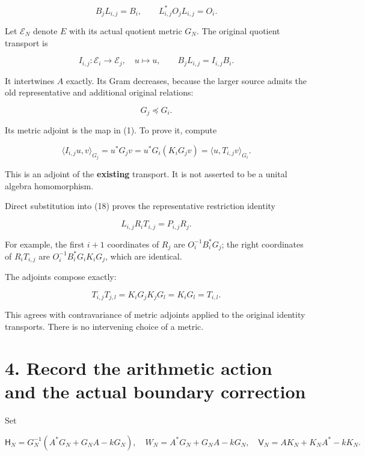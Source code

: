 \documentclass[
  11pt,
]{article}
\begin{document}
\[
 B_jL_{i,j}=B_i,\qquad L_{i,j}^*O_jL_{i,j}=O_i.                   \tag{20}
\]

Let \(\mathscr E_N\) denote \(E\) with its actual quotient metric
\(G_N\). The original quotient transport is

\[
 I_{i,j}:\mathscr E_i\to\mathscr E_j,\quad u\mapsto u,
 \qquad B_jL_{i,j}=I_{i,j}B_i.                                    \tag{21}
\]

It intertwines \(A\) exactly. Its Gram decreases, because the larger
source admits the old representative and additional original relations:

\[
 G_j\preceq G_i.                                                  \tag{22}
\]

Its metric adjoint is the map in (1). To prove it, compute

\[
 \langle I_{i,j}u,v\rangle_{G_j}
 =u^*G_jv
 =u^*G_i(K_iG_jv)
 =\langle u,T_{i,j}v\rangle_{G_i}.                                \tag{23}
\]

This is an adjoint of the \textbf{existing} transport. It is not
asserted to be a unital algebra homomorphism.

Direct substitution into (18) proves the representative restriction
identity

\[
 \boxed{L_{i,j}R_iT_{i,j}=P_{i,j}R_j.}                             \tag{24}
\]

For example, the first \(i+1\) coordinates of \(R_j\) are
\(O_i^{-1}B_i^*G_j\); the right coordinates of \(R_iT_{i,j}\) are
\(O_i^{-1}B_i^*G_iK_iG_j\), which are identical.

The adjoints compose exactly:

\[
 T_{i,j}T_{j,l}=K_iG_jK_jG_l=K_iG_l=T_{i,l}.                      \tag{25}
\]

This agrees with contravariance of metric adjoints applied to the
original identity transports. There is no intervening choice of a
metric.

\section{4. Record the arithmetic action and the actual boundary
correction}\label{record-the-arithmetic-action-and-the-actual-boundary-correction}

Set

\[
 \mathsf H_N=G_N^{-1}(A^*G_N+G_NA-kG_N),\quad
 W_N=A^*G_N+G_NA-kG_N,\quad
 \mathsf V_N=AK_N+K_NA^*-kK_N.                                   \tag{26}
\]
\end{document}
